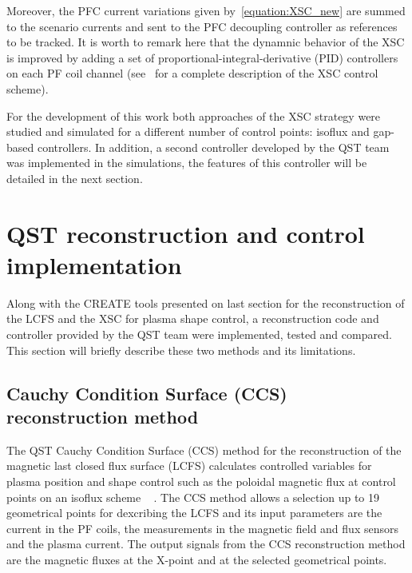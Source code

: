 Moreover, the PFC current variations given by~\eqref{equation:XSC_new} are summed to the scenario currents and sent to the PFC decoupling controller as references to be tracked. It is worth to remark here that the dynamnic behavior of the XSC is improved by adding a set of proportional-integral-derivative (PID) controllers on each PF coil channel (see~\cite{Ariola:XSC} for a complete description of the XSC control scheme).
\smallskip

For the development of this work both approaches of the XSC strategy were studied and simulated for a different number of control points: isoflux and gap-based controllers. In addition, a second controller developed by the QST team was implemented in the simulations, the features of this controller will be detailed in the next section.



\section{QST reconstruction and control implementation}

Along with the CREATE tools presented on last section for the reconstruction of the LCFS and the XSC for plasma shape control, a reconstruction code and controller provided by the QST team were implemented, tested and compared. This section will briefly describe these two methods and its limitations.  

\subsection{Cauchy Condition Surface (CCS) reconstruction  method }
The QST Cauchy Condition Surface (CCS) method for the reconstruction of the magnetic last closed flux surface (LCFS) calculates controlled variables for plasma position and shape control such as the poloidal magnetic flux at control points on an isoflux scheme  ~\cite{CCS} . The CCS method allows a selection up to 19 geometrical points for dexcribing the LCFS and its input parameters are the current in the PF coils, the measurements in the magnetic field and flux sensors and the plasma current. The output signals from the CCS reconstruction method are the magnetic fluxes at the X-point and at the selected geometrical points. 

